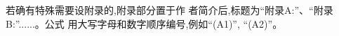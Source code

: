 \documentclass[10.5pt,twocolumn]{aaas}
\begin{document}
\let\OLDthebibliography\thebibliography
\renewcommand\thebibliography[1]{
  \OLDthebibliography{#1}
  \setlength{\parskip}{0pt}
  \setlength{\itemsep}{0pt plus 0.3ex}
}

{
\renewcommand{\baselinestretch}{0.9}
\liuhao


}



% 
% 
% 


\vskip 20pt
 
 
若确有特殊需要设附录的,附录部分置于作
者简介后,标题为“附录A:”、“附录B:”......。公式
用大写字母和数字顺序编号,例如“(A1)”, “(A2)”。





\newpage
\end{document}
